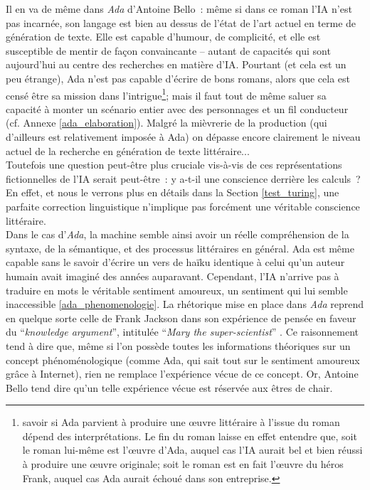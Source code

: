 \documentclass{article}
\begin{document}
					Il en va de même dans \textit{Ada} d'Antoine Bello~: même si dans ce roman l'IA n'est pas incarnée, son langage est bien au dessus de l'état de l'art actuel en terme de génération de texte. Elle est capable d'humour, de complicité, et elle est susceptible de mentir de façon convaincante -- autant de capacités qui sont aujourd’hui au centre des recherches en matière d'IA. Pourtant (et cela est un peu étrange), Ada n'est pas capable d'écrire de bons romans, alors que cela est censé être sa mission dans l'intrigue\footnote{savoir si Ada parvient à produire une œuvre littéraire à l'issue du roman dépend des interprétations. Le fin du roman laisse en effet entendre que, soit le roman lui-même est l'œuvre d'Ada, auquel cas l'IA aurait bel et bien réussi à produire une œuvre originale; soit le roman est en fait l'œuvre du héros Frank, auquel cas Ada aurait échoué dans son entreprise.}; mais il faut tout de même saluer sa capacité à monter un scénario entier avec des personnages et un fil conducteur (cf. Annexe \ref{ada_elaboration}). Malgré la mièvrerie de la production (qui d'ailleurs est relativement imposée à Ada) on dépasse encore clairement le niveau actuel de la recherche en génération de texte littéraire...\\
					
					Toutefois une question peut-être plus cruciale vis-à-vis de ces représentations fictionnelles de l'IA serait peut-être~: y a-t-il une conscience derrière les calculs~? En effet, et nous le verrons plus en détails dans la Section \ref{test_turing}, une parfaite correction linguistique n'implique pas forcément une véritable conscience littéraire.\\
					
					Dans le cas d'\textit{Ada}, la machine semble ainsi avoir un réelle compréhension de la syntaxe, de la sémantique, et des processus littéraires en général. Ada est même capable sans le savoir d'écrire un vers de haïku identique à celui qu'un auteur humain avait imaginé des années auparavant. Cependant, l'IA n'arrive pas à traduire en mots le véritable sentiment amoureux, un sentiment qui lui semble inaccessible \ref{ada_phenomenologie}. La rhétorique mise en place dans \textit{Ada} reprend en quelque sorte celle de Frank Jackson dans son expérience de pensée en faveur du ``\textit{knowledge argument}'', intitulée ``\textit{Mary the super-scientist}'' \cite{jackson1982}. Ce raisonnement tend à dire que, même si l'on possède toutes les informations théoriques sur un concept phénoménologique (comme Ada, qui sait tout sur le sentiment amoureux grâce à Internet), rien ne remplace l'expérience vécue de ce concept. Or, Antoine Bello tend dire qu'un telle expérience vécue est réservée aux êtres de chair.\\
					
\end{document}
